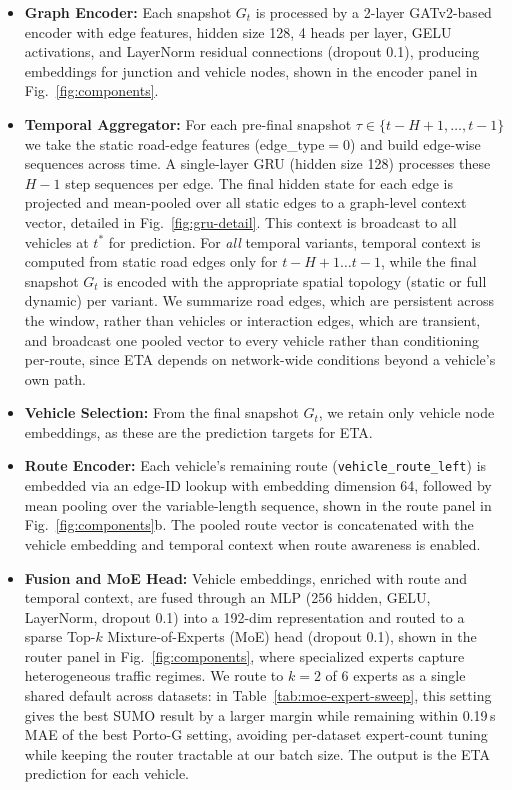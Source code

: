 \begin{itemize}
    \item \textbf{Graph Encoder:} Each snapshot $G_t$ is processed by a 2-layer GATv2-based encoder with edge features, hidden size 128, 4 heads per layer, GELU activations, and LayerNorm residual connections (dropout 0.1), producing embeddings for junction and vehicle nodes, shown in the encoder panel in Fig.~\ref{fig:components}.
    \item \textbf{Temporal Aggregator:} For each pre-final snapshot $\tau\in\{t{-}H{+}1,\ldots,t{-}1\}$ we take the static road-edge features (edge\_type$=0$) and build edge-wise sequences across time. A single-layer GRU (hidden size 128) processes these $H{-}1$ step sequences per edge. The final hidden state for each edge is projected and mean-pooled over all static edges to a graph-level context vector, detailed in Fig.~\ref{fig:gru-detail}. This context is broadcast to all vehicles at $t^*$ for prediction. For \emph{all} temporal variants, temporal context is computed from static road edges only for $t{-}H{+}1\ldots t{-}1$, while the final snapshot $G_t$ is encoded with the appropriate spatial topology (static or full dynamic) per variant. We summarize road edges, which are persistent across the window, rather than vehicles or interaction edges, which are transient, and broadcast one pooled vector to every vehicle rather than conditioning per-route, since ETA depends on network-wide conditions beyond a vehicle's own path.
    \item \textbf{Vehicle Selection:} From the final snapshot $G_t$, we retain only vehicle node embeddings, as these are the prediction targets for ETA.
    \item \textbf{Route Encoder:} Each vehicle's remaining route (\texttt{vehicle\_route\_left}) is embedded via an edge-ID lookup with embedding dimension 64, followed by mean pooling over the variable-length sequence, shown in the route panel in Fig.~\ref{fig:components}b. The pooled route vector is concatenated with the vehicle embedding and temporal context when route awareness is enabled.
    \item \textbf{Fusion and MoE Head:} Vehicle embeddings, enriched with route and temporal context, are fused through an MLP (256 hidden, GELU, LayerNorm, dropout 0.1) into a 192-dim representation and routed to a sparse Top-$k$ Mixture-of-Experts (MoE) head (dropout 0.1), shown in the router panel in Fig.~\ref{fig:components}, where specialized experts capture heterogeneous traffic regimes. We route to $k{=}2$ of 6 experts as a single shared default across datasets: in Table~\ref{tab:moe-expert-sweep}, this setting gives the best SUMO result by a larger margin while remaining within 0.19\,s MAE of the best Porto-G setting, avoiding per-dataset expert-count tuning while keeping the router tractable at our batch size. The output is the ETA prediction for each vehicle.
\end{itemize}

